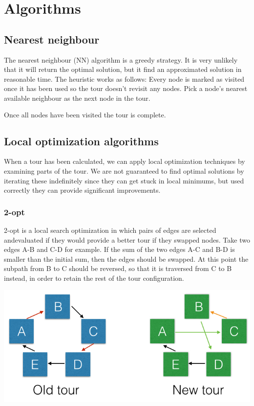 \documentclass[paper=a4, fontsize=11pt,numbers=endperiod]{scrartcl} %
\numberwithin{equation}{section} %
\numberwithin{figure}{section} %
\numberwithin{table}{section} %
\begin{document}
\section{Algorithms}

\subsection{Nearest neighbour}
The nearest neighbour (NN) algorithm is a greedy strategy. It is very unlikely that it will return the optimal solution, but it find an approximated solution in reasonable time.
The heuristic works as follows: 
Every node is marked as visited once it has been used so the tour doesn't revisit any nodes.
Pick a node's nearest available neighbour as the next node in the tour.

Once all nodes have been visited the tour is complete.

\subsection{}

\subsection{Local optimization algorithms}
When a tour has been calculated, we can apply local optimization techniques by examining parts of the tour. We are not guaranteed to find optimal solutions by iterating these indefinitely since they can get stuck in local minimums, but used correctly they can provide significant improvements.

\subsubsection{2-opt}
2-opt is a local search optimization in which pairs of edges are selected andevaluated if they would provide a better tour if they swapped nodes.
Take two edges A-B and C-D for example.
If the sum of the two edges A-C and B-D is smaller than the initial sum, then the edges should be swapped.
At this point the subpath from B to C should be reversed, so that it is traversed from C to B instead, in order to retain the rest of the tour configuration.

\begin{center}
\includegraphics[scale=0.4]{2opt}
\end{center}
\end{document}
